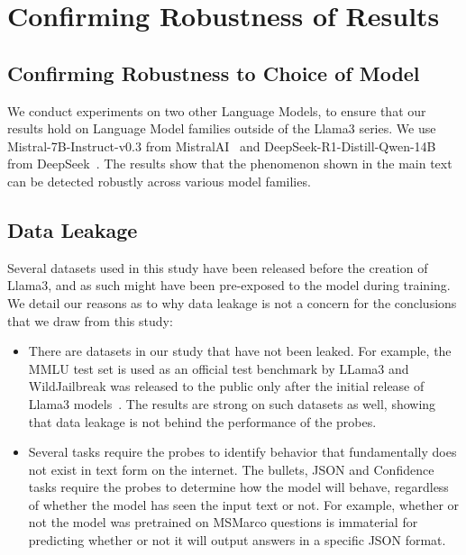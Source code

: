 \section{Confirming Robustness of Results}
\label{sec:appendix_robustness}

\subsection{Confirming Robustness to Choice of Model}
We conduct experiments on two other Language Models, to ensure that our results hold on Language Model families outside of the Llama3 series. We use Mistral-7B-Instruct-v0.3 from MistralAI~\citep{jiang2023mistral} and DeepSeek-R1-Distill-Qwen-14B from DeepSeek~\citep{guo2025deepseek}. The results show that the phenomenon shown in the main text can be detected robustly across various model families.





\subsection{Data Leakage}
Several datasets used in this study have been released before the creation of Llama3, and as such might have been pre-exposed to the model during training. We detail our reasons as to why data leakage is not a concern for the conclusions that we draw from this study:

\begin{itemize}
    \item There are datasets in our study that have not been leaked. For example, the MMLU test set is used as an official test benchmark by LLama3\citep{dubey2024llama} and WildJailbreak was released to the public only after the initial release of Llama3 models~\citep{wildteaming2024}. The results are strong on such datasets as well, showing that data leakage is not behind the performance of the probes.
    \item Several tasks require the probes to identify behavior that fundamentally does not exist in text form on the internet. The bullets, JSON and Confidence tasks require the probes to determine how the model will behave, regardless of whether the model has seen the input text or not. For example, whether or not the model was pretrained on MSMarco questions is immaterial for predicting whether or not it will output answers in a specific JSON format.  
\end{itemize}




